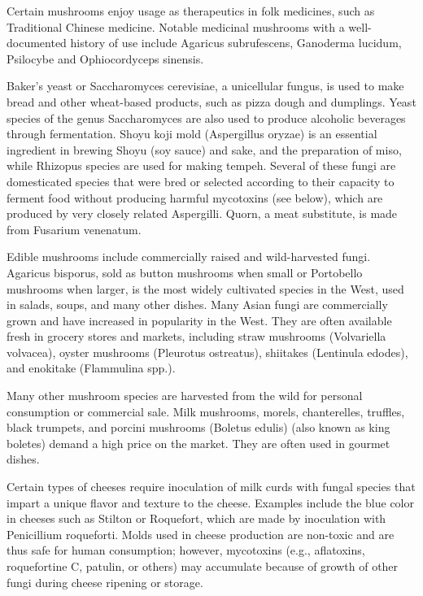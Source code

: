 Certain mushrooms enjoy usage as therapeutics in folk medicines, such as Traditional Chinese medicine. Notable medicinal mushrooms with a well-documented history of use include Agaricus subrufescens, Ganoderma lucidum, Psilocybe and Ophiocordyceps sinensis.

Baker's yeast or Saccharomyces cerevisiae, a unicellular fungus, is used to make bread and other wheat-based products, such as pizza dough and dumplings. Yeast species of the genus Saccharomyces are also used to produce alcoholic beverages through fermentation. Shoyu koji mold (Aspergillus oryzae) is an essential ingredient in brewing Shoyu (soy sauce) and sake, and the preparation of miso, while Rhizopus species are used for making tempeh. Several of these fungi are domesticated species that were bred or selected according to their capacity to ferment food without producing harmful mycotoxins (see below), which are produced by very closely related Aspergilli. Quorn, a meat substitute, is made from Fusarium venenatum.

Edible mushrooms include commercially raised and wild-harvested fungi. Agaricus bisporus, sold as button mushrooms when small or Portobello mushrooms when larger, is the most widely cultivated species in the West, used in salads, soups, and many other dishes. Many Asian fungi are commercially grown and have increased in popularity in the West. They are often available fresh in grocery stores and markets, including straw mushrooms (Volvariella volvacea), oyster mushrooms (Pleurotus ostreatus), shiitakes (Lentinula edodes), and enokitake (Flammulina spp.).

Many other mushroom species are harvested from the wild for personal consumption or commercial sale. Milk mushrooms, morels, chanterelles, truffles, black trumpets, and porcini mushrooms (Boletus edulis) (also known as king boletes) demand a high price on the market. They are often used in gourmet dishes.

Certain types of cheeses require inoculation of milk curds with fungal species that impart a unique flavor and texture to the cheese. Examples include the blue color in cheeses such as Stilton or Roquefort, which are made by inoculation with Penicillium roqueforti. Molds used in cheese production are non-toxic and are thus safe for human consumption; however, mycotoxins (e.g., aflatoxins, roquefortine C, patulin, or others) may accumulate because of growth of other fungi during cheese ripening or storage.

